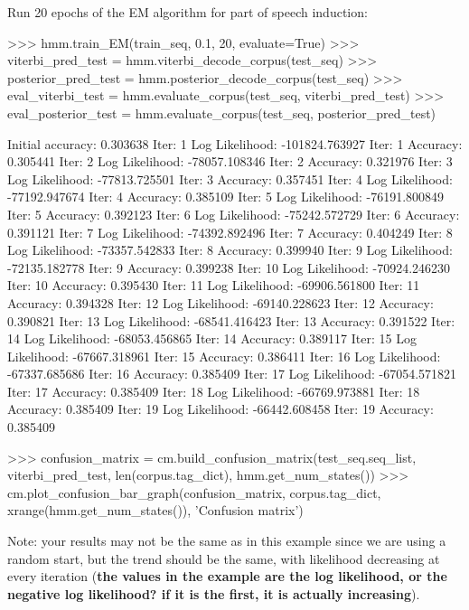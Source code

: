 \begin{exercise}
Run 20 epochs of the EM algorithm for part of speech induction:
\begin{python}
>>> hmm.train_EM(train_seq, 0.1, 20, evaluate=True)
>>> viterbi_pred_test = hmm.viterbi_decode_corpus(test_seq)
>>> posterior_pred_test = hmm.posterior_decode_corpus(test_seq)
>>> eval_viterbi_test =   hmm.evaluate_corpus(test_seq, viterbi_pred_test)
>>> eval_posterior_test = hmm.evaluate_corpus(test_seq, posterior_pred_test)

Initial accuracy: 0.303638
Iter: 1 Log Likelihood: -101824.763927
Iter: 1 Accuracy: 0.305441
Iter: 2 Log Likelihood: -78057.108346
Iter: 2 Accuracy: 0.321976
Iter: 3 Log Likelihood: -77813.725501
Iter: 3 Accuracy: 0.357451
Iter: 4 Log Likelihood: -77192.947674
Iter: 4 Accuracy: 0.385109
Iter: 5 Log Likelihood: -76191.800849
Iter: 5 Accuracy: 0.392123
Iter: 6 Log Likelihood: -75242.572729
Iter: 6 Accuracy: 0.391121
Iter: 7 Log Likelihood: -74392.892496
Iter: 7 Accuracy: 0.404249
Iter: 8 Log Likelihood: -73357.542833
Iter: 8 Accuracy: 0.399940
Iter: 9 Log Likelihood: -72135.182778
Iter: 9 Accuracy: 0.399238
Iter: 10 Log Likelihood: -70924.246230
Iter: 10 Accuracy: 0.395430
Iter: 11 Log Likelihood: -69906.561800
Iter: 11 Accuracy: 0.394328
Iter: 12 Log Likelihood: -69140.228623
Iter: 12 Accuracy: 0.390821
Iter: 13 Log Likelihood: -68541.416423
Iter: 13 Accuracy: 0.391522
Iter: 14 Log Likelihood: -68053.456865
Iter: 14 Accuracy: 0.389117
Iter: 15 Log Likelihood: -67667.318961
Iter: 15 Accuracy: 0.386411
Iter: 16 Log Likelihood: -67337.685686
Iter: 16 Accuracy: 0.385409
Iter: 17 Log Likelihood: -67054.571821
Iter: 17 Accuracy: 0.385409
Iter: 18 Log Likelihood: -66769.973881
Iter: 18 Accuracy: 0.385409
Iter: 19 Log Likelihood: -66442.608458
Iter: 19 Accuracy: 0.385409

>>> confusion_matrix = cm.build_confusion_matrix(test_seq.seq_list, viterbi_pred_test, 
                                             len(corpus.tag_dict), hmm.get_num_states())
>>> cm.plot_confusion_bar_graph(confusion_matrix, corpus.tag_dict, 
                            xrange(hmm.get_num_states()), 'Confusion matrix')
\end{python}
Note: your results may not be the same as in this example since we are using a random start, but the trend should be the same, with likelihood decreasing at every iteration (\textbf{the values in the example are the log likelihood, or the negative log likelihood? if it is the first, it is actually increasing}). 
\end{exercise}

